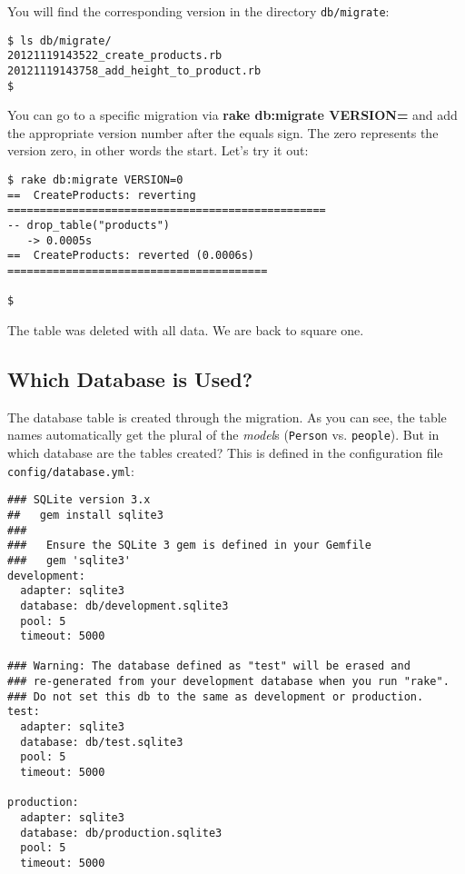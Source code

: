\documentclass[a4paper]{book}
\newcounter{tab}[chapter]
\begin{document}
You will find the corresponding version in the directory \texttt{db/migrate}:

\begin{shaded}\begin{verbatim}
$ ls db/migrate/
20121119143522_create_products.rb
20121119143758_add_height_to_product.rb
$
\end{verbatim}\end{shaded}

You can go to a specific migration via \textbf{rake db:migrate VERSION=} and add the appropriate version number after the equals sign. The zero represents the version zero, in other words the start. Let's try it out:

\begin{shaded}\begin{verbatim}
$ rake db:migrate VERSION=0
==  CreateProducts: reverting =================================================
-- drop_table("products")
   -> 0.0005s
==  CreateProducts: reverted (0.0006s) ========================================

$
\end{verbatim}\end{shaded}

The table was deleted with all data. We are back to square one.

\subsection{Which Database is Used?}\label{which-database-is-used}

The database table is created through the migration. As you can see, the table names automatically get the plural of the \emph{model}s (\texttt{Person} vs. \texttt{people}). But in which database are the tables created? This is defined in the configuration file \texttt{config/database.yml}:

\begin{shaded}\begin{verbatim}
### SQLite version 3.x
##   gem install sqlite3
###
###   Ensure the SQLite 3 gem is defined in your Gemfile
###   gem 'sqlite3'
development:
  adapter: sqlite3
  database: db/development.sqlite3
  pool: 5
  timeout: 5000

### Warning: The database defined as "test" will be erased and
### re-generated from your development database when you run "rake".
### Do not set this db to the same as development or production.
test:
  adapter: sqlite3
  database: db/test.sqlite3
  pool: 5
  timeout: 5000

production:
  adapter: sqlite3
  database: db/production.sqlite3
  pool: 5
  timeout: 5000
\end{verbatim}\end{shaded}
\end{document}
